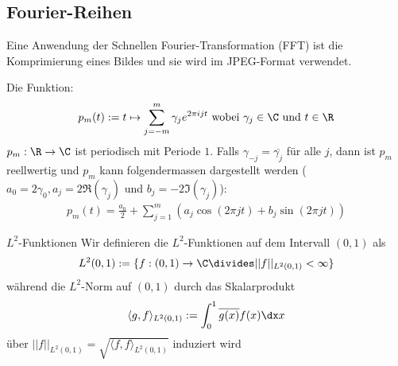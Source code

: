 
%
\subsection{Fourier-Reihen}
Eine Anwendung der Schnellen Fourier-Transformation (FFT) ist die Komprimierung eines Bildes und sie wird im JPEG-Format verwendet.

 Die Funktion:
\rmvspace
\begin{align*}
    p_m(t) := t \mapsto \sum_{j = -m}^{m} \gamma_j e^{2 \pi ijt} \text{ wobei } \gamma_j \in \C \text{ und } t \in \R
\end{align*}
%
%
\inlineremark $p_m : \R \rightarrow \C$ ist periodisch mit Periode $1$.
Falls $\gamma_{-j} = \overline{\gamma_j}$ für alle $j$, dann ist $p_m$ reellwertig und
$p_m$ kann folgendermassen dargestellt werden ($a_0 = 2\gamma_0, a_j = 2\Re(\gamma_j)$ und $b_j = -2\Im(\gamma_j)$):
\rmvspace
\begin{align*}
    p_m(t) = \frac{a_0}{2} + \sum_{j = 1}^{m} (a_j \cos(2\pi jt) + b_j \sin(2\pi jt))
\end{align*}

\begin{definition}[]{$L^2$-Funktionen}
    Wir definieren die $L^2$-Funktionen auf dem Intervall $(0, 1)$ als
    \rmvspace
    \begin{align*}
        L^2(0, 1) := \{ f: (0, 1) \rightarrow \C \divides ||f||_{L^2(0, 1)} < \infty \}
    \end{align*}
    während die $L^2$-Norm auf $(0, 1)$ durch das Skalarprodukt
    \rmvspace
    \begin{align*}
        \langle g, f \rangle_{L^2(0, 1)} := \int_{0}^{1} \overline{g(x)} f(x) \dx x
    \end{align*}
    über $||f||_{L^2(0, 1)} = \sqrt{\langle f, f \rangle_{L^2(0, 1)}}$ induziert wird
\end{definition}

